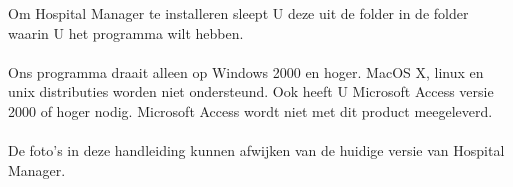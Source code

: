Om Hospital Manager te installeren sleept U deze uit de folder in de folder waarin U het programma wilt hebben. \\
\\
Ons programma draait alleen op Windows 2000 en hoger. MacOS X, linux en unix distributies worden niet ondersteund. Ook heeft U Microsoft Access versie 2000 of hoger nodig. Microsoft Access wordt niet met dit product meegeleverd. \\
\\
De foto's in deze handleiding kunnen afwijken van de huidige versie van Hospital Manager.
